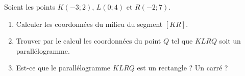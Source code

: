 
\begin{exercice}\label{exosmath-0521}

    Soient les points \( K(-3;2)\), \( L(0;4)\) et \( R(-2;7)\).
    \begin{enumerate}
        \item
            Calculer les coordonnées du milieu du segment \( [KR]\).
        \item
            Trouver par le calcul les coordonnées du point \( Q\) tel que \( KLRQ\) soit un parallélogramme.
        \item
            Est-ce que le parallélogramme \( KLRQ\) est un rectangle ? Un carré ?
    \end{enumerate}

\end{exercice}
